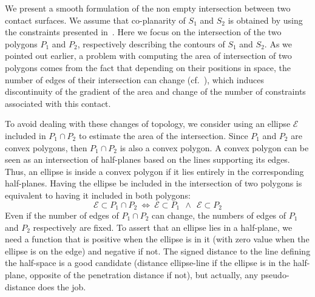 We present a smooth formulation of the non empty intersection between two contact surfaces.
We assume that co-planarity of $S_1$ and $S_2$ is obtained by using the constraints presented in~.
Here we focus on the intersection of the two polygons $P_1$ and $P_2$, respectively describing the contours of $S_1$ and $S_2$.
As we pointed out earlier, a problem with computing the area of intersection of two polygons comes from the fact that depending on their positions in space, the number of edges of their intersection can change (cf.~), which induces discontinuity of the gradient of the area and change of the number of constraints associated with this contact.

To avoid dealing with these changes of topology, we consider using an ellipse $\mathcal{E}$ included in $P_1 \cap P_2$ to estimate the area of the intersection.
Since $P_1$ and $P_2$ are convex polygons, then $P_1 \cap P_2$ is also a convex polygon.
A convex polygon can be seen as an intersection of half-planes based on the lines supporting its edges.
Thus, an ellipse is inside a convex polygon if it lies entirely in the corresponding half-planes.
Having the ellipse be included in the intersection of two polygons is equivalent to having it included in both polygons:
\begin{equation}
\mathcal{E} \subset P_1 \cap P_2 \ \Longleftrightarrow \
\mathcal{E} \subset P_1 \ \ \wedge \ \  \mathcal{E} \subset P_2
\end{equation}
Even if the number of edges of $P_1 \cap P_2$ can change, the numbers of edges of $P_1$ and $P_2$ respectively are fixed.
To assert that an ellipse lies in a half-plane, we need a function that is positive when the ellipse is in it (with zero value when the ellipse is on the edge) and negative if not.
The signed distance to the line defining the half-space is a good candidate (distance ellipse-line if the ellipse is in the half-plane, opposite of the penetration distance if not), but actually, any pseudo-distance does the job.
